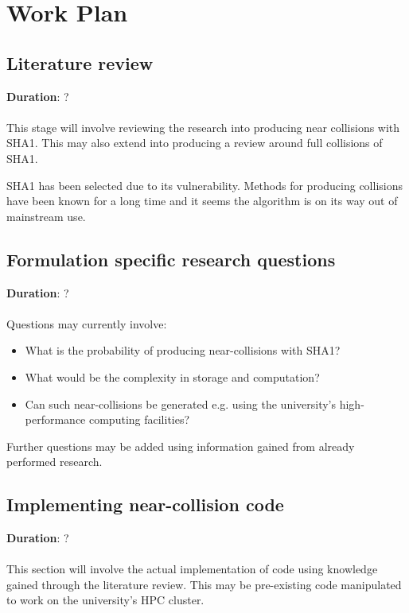 \chapter{Work Plan}

\section{Literature review}
\label{litReview}
\textbf{Duration}: ? 
\\\\
This stage will involve reviewing the research into producing near collisions with SHA1. This may also extend into producing a review around full collisions of SHA1.
\par
SHA1 has been selected due to its vulnerability. Methods for producing collisions have been known for a long time and it seems the algorithm is on its way out of mainstream use.

\section{Formulation specific research questions}
\textbf{Duration}: ?
\\\\
Questions may currently involve:

\begin{itemize}
    \item What is the probability of producing near-collisions with SHA1?
    \item What would be the complexity in storage and computation?
    \item Can such near-collisions be generated e.g. using the university’s high-performance computing facilities? 
\end{itemize}

Further questions may be added using information gained from already performed research.



\section{Implementing near-collision code}
\label{code}
\textbf{Duration}: ?
\\\\
This section will involve the actual implementation of code using knowledge gained through the literature review. This may be pre-existing code manipulated to work on the university’s HPC cluster.

